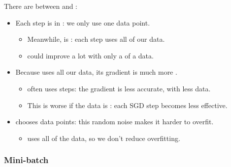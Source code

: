             \begin{concept}
                There are  between  and :
                
                \begin{itemize}
                    \item Each step is  in : we only use one data point. 
                        \begin{itemize}
                            \item Meanwhile,  is : each step uses all of our data.
                            \item {} could improve a lot with only a  of a data.
                        \end{itemize}

                        \phantom{}
                        
                    \item Because  uses all our data, its gradient is much more .
                        \begin{itemize}
                            \item {} often uses  steps: the gradient is less accurate, with less data.
                            \item This is worse if the data is : each SGD step becomes less effective.
                        \end{itemize}

                        \phantom{}
                        
                    \item {}  chooses data points: this random noise makes it harder to overfit.
                        \begin{itemize}
                            \item {} uses all of the data, so we don't reduce overfitting.
                        \end{itemize}
                \end{itemize}
            \end{concept}
        
        \phantom{}
        
        \subsubsection{Mini-batch}
        
